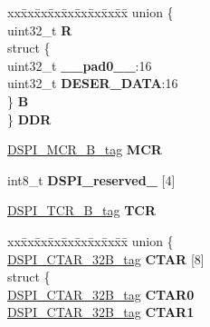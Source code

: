 \begin{DoxyCompactItemize}
\begin{tabbing}
\end{tabbing}\item 
\mbox{\label{structDSPI__tag_a80fde8102172660c20567e7448a90d05}} 
\begin{tabbing}
xx\=xx\=xx\=xx\=xx\=xx\=xx\=xx\=xx\=\kill
union \{\\
\>uint32\_t {\bfseries R}\\
\>struct \{\\
\>\>uint32\_t {\bfseries \_\_pad0\_\_}:16\\
\>\>uint32\_t {\bfseries DESER\_DATA}:16\\
\>\} {\bfseries B}\\
\} {\bfseries DDR}\\

\end{tabbing}\item 
\mbox{\label{structDSPI__tag_aa3b6d481a9804c492ac85269a0f3637f}} 
\mbox{\hyperlink{unionDSPI__MCR__tag}{D\+S\+P\+I\+\_\+\+M\+C\+R\+\_\+B\+\_\+tag}} {\bfseries M\+CR}
\item 
\mbox{\label{structDSPI__tag_a83c87561d872c936fcc50ee7f5c448b1}} 
int8\+\_\+t {\bfseries D\+S\+P\+I\+\_\+reserved\+\_} \mbox{[}4\mbox{]}
\item 
\mbox{\label{structDSPI__tag_ab40eefbe70299aee1e5eab89f63d733a}} 
\mbox{\hyperlink{unionDSPI__TCR__32B__tag}{D\+S\+P\+I\+\_\+\+T\+C\+R\+\_\+B\+\_\+tag}} {\bfseries T\+CR}
\item 
\mbox{\label{structDSPI__tag_a6822d260460c3a4855be61cf7f629ab9}} 
\begin{tabbing}
xx\=xx\=xx\=xx\=xx\=xx\=xx\=xx\=xx\=\kill
union \{\\
\>\mbox{\hyperlink{unionDSPI__CTAR__tag}{DSPI\_CTAR\_32B\_tag}} {\bfseries CTAR} \mbox{[}8\mbox{]}\\
\mbox{\label{unionDSPI__tag_1_1_0D2315_aa4a131097b49708c1617e7afe4b2056e}} 
\>struct \{\\
\>\>\mbox{\hyperlink{unionDSPI__CTAR__tag}{DSPI\_CTAR\_32B\_tag}} {\bfseries CTAR0}\\
\>\>\mbox{\hyperlink{unionDSPI__CTAR__tag}{DSPI\_CTAR\_32B\_tag}} {\bfseries CTAR1}\\

\end{tabbing}
\end{DoxyCompactItemize}
